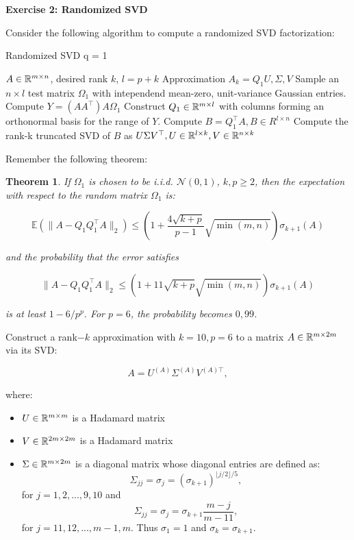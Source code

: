 \documentclass[11pt]{article}
\newtheorem{theorem}{Theorem}
\begin{document}
\bigskip

{\bf{Exercise 2: Randomized SVD}}

Consider the following algorithm to compute a randomized SVD factorization:

\scriptsize
\begin{algorithm}
\caption{Randomized SVD q = 1}\label{Randomized SVD}
\begin{algorithmic}
\Input $A \in \mathbb{R}^{m \times n}$, desired rank $k$, $l = p+k$
\Output Approximation $A_k = Q_1U, \Sigma, V$
\State Sample an $n \times l$ test matrix $\Omega_1$ with intependend mean-zero, unit-variance Gaussian entries.
\State Compute $Y = (AA^{\top})A\Omega_1$
\State Construct $Q_1 \in \mathbb{R}^{m \times l}$ with columns forming an orthonormal basis for the range of $Y$.
\State Compute $B = Q_1^{\top} A, B \in R^{l \times n}$
\State Compute the rank-k truncated SVD of $B$ as $U\Sigma V^{\top}, U \in \mathbb{R}^{l \times k}, V\in \mathbb{R}^{n \times k}$
\end{algorithmic}
\end{algorithm}
\normalsize

Remember the following theorem:

\begin{theorem}
If $\Omega_1$ is chosen to be i.i.d. $\mathcal{N}(0, 1)$, $k, p \geq 2$, then the expectation with respect to the random matrix $\Omega_1$ is:

\[ \mathbb{E}(\|A - Q_1Q_1^{\top}A\|_2) \leq \left( 1 + \frac{4 \sqrt{k + p}}{p - 1} \sqrt{\min(m, n)} \right) \sigma_{k+1}(A) \]

and the probability that the error satisfies

\[ \|A - Q_1Q_1^{\top}A\|_2 \leq \left( 1 + 11 \sqrt{k + p} \sqrt{\min(m, n)} \right)\sigma_{k+1}(A) \]

is at least $1 - 6/p^p$. For $p = 6$, the probability becomes $0,99$.

\end{theorem}

Construct a rank$-k$ approximation with $k = 10, p=6$ to a matrix $A \in \mathbb{R}^{m \times 2m}$ via its SVD:

\[ A = U^{(A)} \Sigma^{(A)} V^{(A)\top}, \]

where:

\begin{itemize}
    \item $U \in \mathbb{R}^{m \times m}$ is a Hadamard matrix
    \item $V \in \mathbb{R}^{2m \times 2m}$ is a Hadamard matrix
    \item $\Sigma \in \mathbb{R}^{m \times 2m}$ is a diagonal matrix whose diagonal entries are defined as:
    \[ \Sigma_{jj} = \sigma_j = (\sigma_{k+1})^{\lfloor j/2 \rfloor / 5}, \]
    for $j = 1, 2, ..., 9, 10$ and
    \[ \Sigma_{jj} = \sigma_j = \sigma_{k+1} \frac{m-j}{m-11}, \]
    for $j = 11, 12, ..., m-1, m$. Thus $\sigma_1 = 1$ and $\sigma_k = \sigma_{k+1}$.
\end{itemize}
\end{document}
